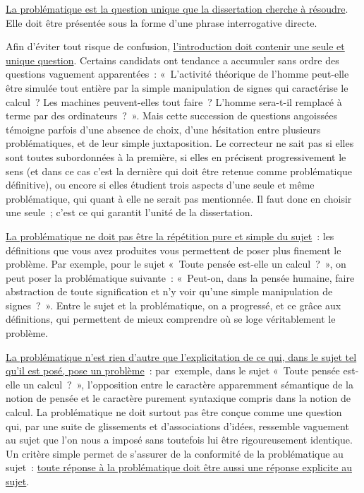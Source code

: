 \documentclass[a4paper,12pt]{article}
\begin{document}
\uline{La problématique est la question unique que la dissertation cherche à
résoudre}. Elle doit être présentée sous la forme d'une phrase
interrogative directe.

Afin d'éviter tout risque de confusion, \uline{l'introduction doit contenir
une seule et unique question}. Certains candidats ont tendance a
accumuler sans ordre des questions vaguement apparentées : « L'activité
théorique de l'homme peut-elle être simulée tout entière par la simple
manipulation de signes qui caractérise le calcul ? Les machines
peuvent-elles tout faire ? L'homme sera-t-il remplacé à terme par des
ordinateurs ? ». Mais cette succession de questions angoissées témoigne
parfois d'une absence de choix, d'une hésitation entre plusieurs
problématiques, et de leur simple juxtaposition. Le correcteur ne sait
pas si elles sont toutes subordonnées à la première, si elles en
précisent progressivement le sens (et dans ce cas c'est la dernière qui
doit être retenue comme problématique définitive), ou encore si elles
étudient trois aspects d'une seule et même problématique, qui quant à
elle ne serait pas mentionnée. Il faut donc en choisir une seule ; c'est
ce qui garantit l'unité de la dissertation.

\uline{La problématique ne doit pas être la répétition pure et simple du
sujet} : les définitions que vous avez produites vous permettent de
poser plus finement le problème. Par exemple, pour le sujet « Toute
pensée est-elle un calcul ? », on peut poser la problématique suivante :
« Peut-on, dans la pensée humaine, faire abstraction de toute
signification et n'y voir qu'une simple manipulation de signes ? ».
Entre le sujet et la problématique, on a progressé, et ce grâce aux
définitions, qui permettent de mieux comprendre où se loge véritablement
le problème.

\uline{La problématique n'est rien d'autre que l'explicitation de ce qui, dans
le sujet tel qu'il est posé, pose un problème} : par exemple, dans le
sujet « Toute pensée est-elle un calcul ? », l'opposition entre le
caractère apparemment sémantique de la notion de pensée et le caractère
purement syntaxique compris dans la notion de calcul. La problématique
ne doit surtout pas être conçue comme une question qui, par une suite de
glissements et d'associations d'idées, ressemble vaguement au sujet que
l'on nous a imposé sans toutefois lui être rigoureusement identique. Un
critère simple permet de s'assurer de la conformité de la problématique
au sujet : \uline{toute réponse à la problématique doit être aussi une réponse
explicite au sujet}.
\end{document}
